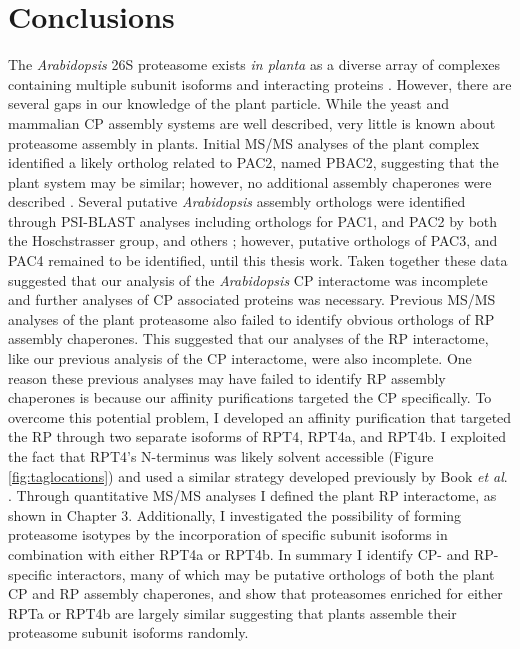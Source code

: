 \section{Conclusions}
The \textit{Arabidopsis} 26S proteasome exists \textit{in planta} as a diverse array of complexes containing multiple subunit isoforms and interacting proteins \citep{book10, fu99, yang04}. However, there are several gaps in our knowledge of the plant particle.  While the yeast and mammalian CP assembly systems are well described, very little is known about proteasome assembly in plants. Initial MS/MS analyses of the plant complex identified a likely ortholog related to PAC2, named PBAC2, suggesting that the plant system may be similar; however, no additional assembly chaperones were described \citep{book10}. Several putative \textit{Arabidopsis} assembly orthologs were identified through PSI-BLAST analyses including orthologs for PAC1, and PAC2 by both the Hoschstrasser group, and others \citep{kusmierczyk11, le07}; however, putative orthologs of PAC3, and PAC4 remained to be identified, until this thesis work. Taken together these data suggested that our analysis of the \textit{Arabidopsis} CP interactome was incomplete and further analyses of CP associated proteins was necessary.
Previous MS/MS analyses of the plant proteasome also failed to identify obvious orthologs of RP assembly chaperones. This suggested that our analyses of the RP interactome, like our previous analysis of the CP interactome, were also incomplete. One reason these previous analyses may have failed to identify RP assembly chaperones is because our affinity purifications targeted the CP specifically. To overcome this potential problem, I developed an affinity purification that targeted the RP through two separate isoforms of RPT4, RPT4a, and RPT4b. I exploited the fact that RPT4's N-terminus was likely solvent accessible (Figure \ref{fig:taglocations}) and used a similar strategy developed previously by Book \textit{et al}. \citep{book10}. Through quantitative MS/MS analyses I defined the plant RP interactome, as shown in Chapter 3. Additionally, I investigated the possibility of forming proteasome isotypes by the incorporation of specific subunit isoforms in combination with either RPT4a or RPT4b.  In summary I identify CP- and RP-specific interactors, many of which may be putative orthologs of both the plant CP and RP assembly chaperones, and show that proteasomes enriched for either RPTa or RPT4b are largely similar suggesting that plants assemble their proteasome subunit isoforms randomly.

